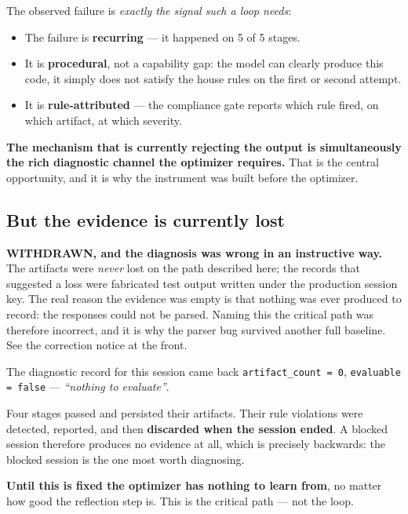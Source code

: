 \documentclass[11pt,a4paper]{article}
\begin{document}
The observed failure is \emph{exactly the signal such a loop needs}:

\begin{itemize}[leftmargin=1.4em]
  \item The failure is \textbf{recurring} --- it happened on 5 of 5 stages.
  \item It is \textbf{procedural}, not a capability gap: the model can clearly
  produce this code, it simply does not satisfy the house rules on the first or
  second attempt.
  \item It is \textbf{rule-attributed} --- the compliance gate reports which rule
  fired, on which artifact, at which severity.
\end{itemize}

\textbf{The mechanism that is currently rejecting the output is simultaneously the
rich diagnostic channel the optimizer requires.} That is the central opportunity,
and it is why the instrument was built before the optimizer.

\subsection{But the evidence is currently lost}
\label{sec:lost}

\begin{notebox}[colframe=warn]
\textbf{WITHDRAWN, and the diagnosis was wrong in an instructive way.} The artifacts
were \emph{never} lost on the path described here; the records that suggested a loss
were fabricated test output written under the production session key. The real reason
the evidence was empty is that nothing was ever produced to record: the responses
could not be parsed. Naming this the critical path was therefore incorrect, and it is
why the parser bug survived another full baseline. See the correction notice at the
front.
\end{notebox}

The diagnostic record for this session came back
\texttt{artifact\_count = 0}, \texttt{evaluable = false} --- \emph{``nothing to
evaluate''}.

Four stages passed and persisted their artifacts. Their rule violations were
detected, reported, and then \textbf{discarded when the session ended}. A blocked
session therefore produces no evidence at all, which is precisely backwards: the
blocked session is the one most worth diagnosing.

\textbf{Until this is fixed the optimizer has nothing to learn from}, no matter
how good the reflection step is. This is the critical path --- not the loop.
\end{document}
